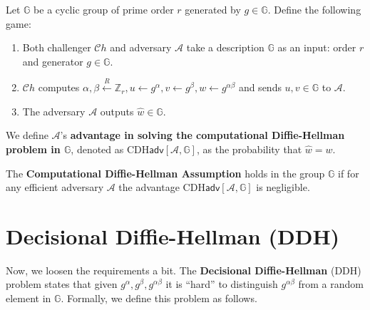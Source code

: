 \documentclass[../lecture-notes.tex]{subfiles}
\begin{document}
\begin{definition}
    Let $\mathbb{G}$ be a cyclic group of prime order $r$ generated by $g \in \mathbb{G}$. Define the following game:
    \begin{enumerate}
        \item Both challenger $\mathcal{C}h$ and adversary $\mathcal{A}$ take a description $\mathbb{G}$ as an input: order $r$ and generator $g \in \mathbb{G}$.
        \item $\mathcal{C}h$ computes $\alpha, \beta \xleftarrow{R} \mathbb{Z}_r, u \gets g^{\alpha}, v \gets g^{\beta}, w \gets g^{\alpha\beta}$ and sends $u,v \in \mathbb{G}$ to $\mathcal{A}$.
        \item The adversary $\mathcal{A}$ outputs $\hat{w} \in \mathbb{G}$.
    \end{enumerate}

    We define $\mathcal{A}$'s \textbf{advantage in solving the computational Diffie-Hellman problem in $\mathbb{G}$}, denoted as $\text{CDH}\mathsf{adv}[\mathcal{A},\mathbb{G}]$, as the probability that $\hat{w} = w$.
\end{definition}

\begin{definition}
    The \textbf{Computational Diffie-Hellman Assumption} holds in the group $\mathbb{G}$ if for any efficient adversary $\mathcal{A}$ the advantage $\text{CDH}\mathsf{adv}[\mathcal{A},\mathbb{G}]$ is negligible.
\end{definition}

\section{Decisional Diffie-Hellman (DDH)}

Now, we loosen the requirements a bit. The \textbf{Decisional Diffie-Hellman} (DDH) problem states that given $g^{\alpha},g^{\beta},g^{\alpha\beta}$ it is ``hard'' to distinguish $g^{\alpha\beta}$ from a random element in $\mathbb{G}$. Formally, we define this problem as follows.
\end{document}
